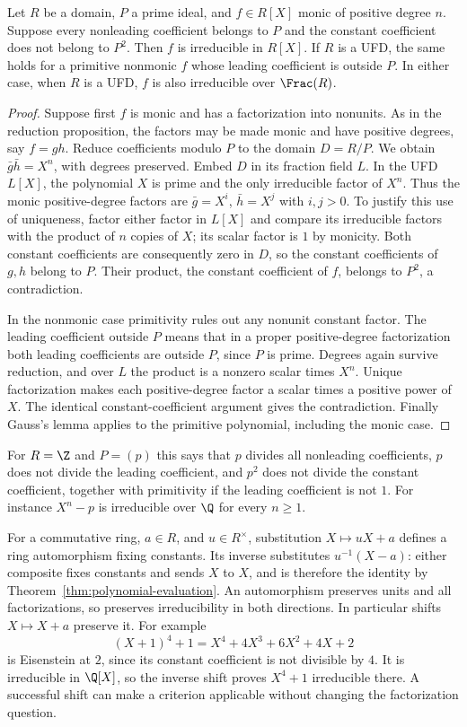 \begin{theorem}\label{thm:eisenstein}
Let $R$ be a domain, $P$ a prime ideal, and $f\in R[X]$ monic
of positive degree $n$. Suppose every nonleading coefficient belongs
to $P$ and the constant coefficient does not belong to $P^2$.
Then $f$ is irreducible in $R[X]$.
If $R$ is a UFD, the same holds for a primitive nonmonic $f$
whose leading coefficient is outside $P$. In either case, when
$R$ is a UFD, $f$ is also irreducible over $\Frac(R)$.
\end{theorem}
\begin{proof}
Suppose first $f$ is monic and has a factorization into nonunits.
As in the reduction proposition, the factors may be made monic
and have positive degrees, say $f=gh$. Reduce coefficients modulo
$P$ to the domain $D=R/P$. We obtain
$\bar g\bar h=X^n$, with degrees preserved. Embed $D$ in its
fraction field $L$. In the UFD $L[X]$, the polynomial $X$ is
prime and the only irreducible factor of $X^n$. Thus the monic
positive-degree factors are $\bar g=X^i$, $\bar h=X^j$ with
$i,j>0$. To justify this use of uniqueness, factor either factor
in $L[X]$ and compare its irreducible factors with the product of
$n$ copies of $X$; its scalar factor is $1$ by monicity.
Both constant coefficients are consequently zero in $D$, so the
constant coefficients of $g,h$ belong to $P$. Their product,
the constant coefficient of $f$, belongs to $P^2$, a contradiction.

In the nonmonic case primitivity rules out any nonunit constant factor.
The leading coefficient outside $P$ means that in a proper
positive-degree factorization both leading coefficients are outside
$P$, since $P$ is prime. Degrees again survive reduction, and over
$L$ the product is a nonzero scalar times $X^n$. Unique
factorization makes each positive-degree factor a scalar times a
positive power of $X$. The identical constant-coefficient argument
gives the contradiction. Finally Gauss's lemma applies to the
primitive polynomial, including the monic case.
\end{proof}
For $R=\Z$ and $P=(p)$ this says that $p$ divides all nonleading
coefficients, $p$ does not divide the leading coefficient, and $p^2$
does not divide the constant coefficient, together with primitivity
if the leading coefficient is not $1$. For instance $X^n-p$ is
irreducible over $\Q$ for every $n\ge1$.

For a commutative ring, $a\in R$, and $u\in R^\times$, substitution
$X\mapsto uX+a$ defines a ring automorphism fixing constants.
Its inverse substitutes $u^{-1}(X-a)$: either composite fixes
constants and sends $X$ to $X$, and is therefore the identity by
Theorem~\ref{thm:polynomial-evaluation}. An automorphism preserves
units and all factorizations, so preserves irreducibility in both
directions. In particular shifts $X\mapsto X+a$ preserve it.
For example
\[
 (X+1)^4+1=X^4+4X^3+6X^2+4X+2
\]
is Eisenstein at $2$, since its constant coefficient is not divisible
by $4$. It is irreducible in $\Q[X]$, so the inverse shift proves
$X^4+1$ irreducible there. A successful shift can make a criterion
applicable without changing the factorization question.

